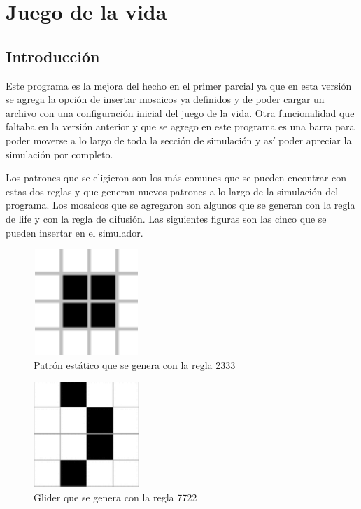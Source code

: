 \section{Juego de la vida}
\subsection{Introducción}
Este programa es la mejora del hecho en el primer parcial ya que en esta versión se agrega la opción de insertar mosaicos ya definidos y de poder cargar un archivo con una configuración inicial del juego de la vida. Otra funcionalidad que faltaba en la versión anterior y que se agrego en este programa es una barra para poder moverse a lo largo de toda la sección de simulación y así poder apreciar la simulación por completo.

Los patrones que se eligieron son los más comunes que se pueden encontrar con estas dos reglas y que generan nuevos patrones a lo largo de la simulación del programa. Los mosaicos que se agregaron son algunos que se generan con la regla de life y con la regla de difusión. Las siguientes figuras son las cinco que se pueden insertar en el simulador.

\begin{figure}[H]
\begin{center}
 \includegraphics[width=4cm, height=4cm]{./img/cuadrado.png}
 \caption{Patrón estático que se genera con la regla 2333}
 \label{fig:cuadrado}
\end{center}
\end{figure}

\begin{figure}[H]
\begin{center}
 \includegraphics[width=4cm, height=4cm]{./img/glider.png}
 \caption{Glider que se genera con la regla 7722}
 \label{fig:glider}
\end{center}
\end{figure}

